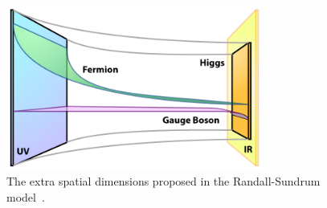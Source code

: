 \begin{figure}[h]
	\centering
	\includegraphics[width=0.75\textwidth]{figures/RSBrane.png}
	\caption{The extra spatial dimensions proposed in the Randall-Sundrum model~\cite{RSBrane}.}
	\label{fig:rsrbane}
\end{figure}

